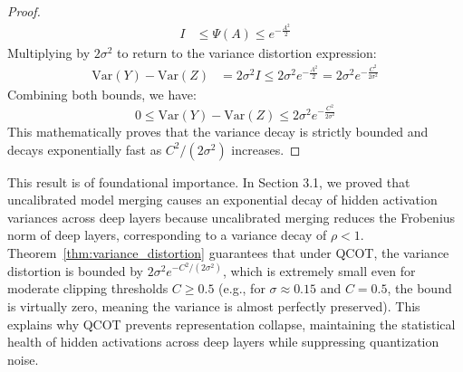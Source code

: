 \documentclass{article}
\theoremstyle{plain}
\theoremstyle{definition}
\theoremstyle{remark}
\begin{document}
\begin{proof}
\begin{align}
    I &\le \Psi(A) \le e^{-\frac{A^2}{2}}
\end{align}
Multiplying by $2\sigma^2$ to return to the variance distortion expression:
\begin{align}
    \text{Var}(Y) - \text{Var}(Z) &= 2\sigma^2 I \le 2\sigma^2 e^{-\frac{A^2}{2}} = 2\sigma^2 e^{-\frac{C^2}{2\sigma^2}}
\end{align}
Combining both bounds, we have:
\begin{equation}
    0 \le \text{Var}(Y) - \text{Var}(Z) \le 2\sigma^2 e^{-\frac{C^2}{2\sigma^2}}
\end{equation}
This mathematically proves that the variance decay is strictly bounded and decays exponentially fast as $C^2 / (2\sigma^2)$ increases.
\end{proof}

This result is of foundational importance. In Section 3.1, we proved that uncalibrated model merging causes an exponential decay of hidden activation variances across deep layers because uncalibrated merging reduces the Frobenius norm of deep layers, corresponding to a variance decay of $\rho < 1$. Theorem~\ref{thm:variance_distortion} guarantees that under QCOT, the variance distortion is bounded by $2\sigma^2 e^{-C^2 / (2\sigma^2)}$, which is extremely small even for moderate clipping thresholds $C \ge 0.5$ (e.g., for $\sigma \approx 0.15$ and $C=0.5$, the bound is virtually zero, meaning the variance is almost perfectly preserved). This explains why QCOT prevents representation collapse, maintaining the statistical health of hidden activations across deep layers while suppressing quantization noise.
\end{document}
